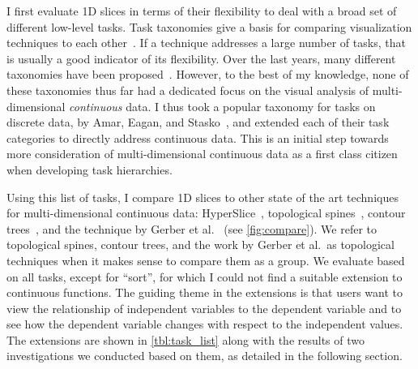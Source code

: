 I first evaluate 1D slices in terms of their flexibility to deal with a broad
set of different low-level tasks.  Task taxonomies give a basis for comparing
visualization techniques to each other~\cite{Munzner:2014}.
If a technique addresses a large number of tasks, that is usually a good
indicator of its flexibility.  Over the last years, many different taxonomies
have been proposed~\cite{Amar:2005,brehmer:2013,Heer:2012,Sedlmair:2014}.
However, to the best of my knowledge, none of these taxonomies thus far had a
dedicated focus on the visual analysis of multi-dimensional \textit{continuous}
data. I thus took a popular taxonomy for tasks on discrete data, by Amar,
Eagan, and Stasko~\cite{Amar:2005}, and extended each of their task categories
to directly address continuous data. This is an initial step towards
more consideration of multi-dimensional continuous data as a first class
citizen when developing task hierarchies.

Using this list of tasks, I compare 1D slices to other state of the art
techniques for multi-dimensional continuous data: HyperSlice~\cite{Wijk:1993},
topological spines~\cite{Correa:2011}, contour trees~\cite{Carr:2003}, and the
technique by Gerber et al.~\cite{Gerber:2010} (see \autoref{fig:compare}).  We
refer to topological spines, contour trees, and the work by Gerber et al.\ as
topological techniques when it makes sense to compare them as a group.
We evaluate based on all tasks, except for ``sort'', for which I could not
find a suitable extension to continuous functions.  The guiding theme in the
extensions is that users want to view the relationship of independent variables
to the dependent variable and to see how the dependent variable changes with
respect to the independent values.  The extensions are shown in
\autoref{tbl:task_list} along with the results of two investigations we
conducted based on them, as detailed in the following section.





%

